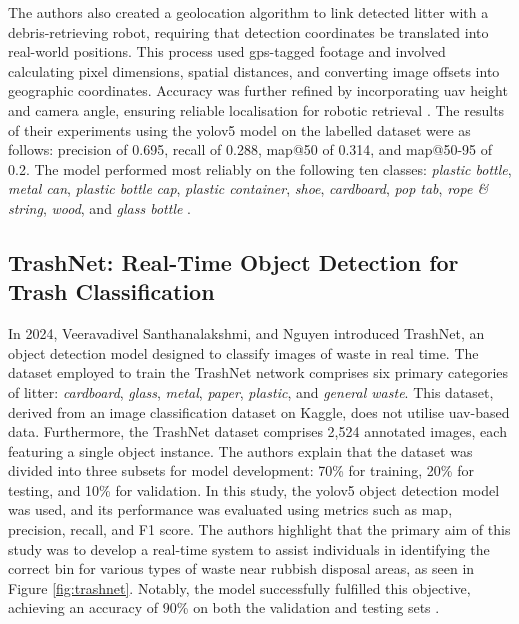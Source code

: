 The authors also created a geolocation algorithm to link detected litter with a debris-retrieving robot, requiring that detection coordinates be translated into real-world positions. This process used \gls{gps}-tagged footage and involved calculating pixel dimensions, spatial distances, and converting image offsets into geographic coordinates. Accuracy was further refined by incorporating \gls{uav} height and camera angle, ensuring reliable localisation for robotic retrieval \cite{beach_litter}.
The results of their experiments using the \gls{yolo}v5 model on the labelled dataset were as follows: precision of 0.695, recall of 0.288, \gls{map}@50 of 0.314, and \gls{map}@50-95 of 0.2. The model performed most reliably on the following ten classes: \textit{plastic bottle}, \textit{metal can}, \textit{plastic bottle} \textit{cap}, \textit{plastic container}, \textit{shoe}, \textit{cardboard}, \textit{pop tab}, \textit{rope \& string}, \textit{wood}, and \textit{glass bottle} \cite{beach_litter}.

\subsection{TrashNet: Real-Time Object Detection for Trash Classification}
\label{subsec:3_trashnet}

In 2024, Veeravadivel Santhanalakshmi, and Nguyen introduced TrashNet, an object detection model designed to classify images of waste in real time. The dataset employed to train the TrashNet network comprises six primary categories of litter: \textit{cardboard}, \textit{glass}, \textit{metal}, \textit{paper}, \textit{plastic}, and \textit{general waste}. This dataset, derived from an image classification dataset on Kaggle, does not utilise \gls{uav}-based data. Furthermore, the TrashNet dataset comprises 2,524 annotated images, each featuring a single object instance. The authors explain that the dataset was divided into three subsets for model development: 70\% for training, 20\% for testing, and 10\% for validation.
In this study, the \gls{yolo}v5 object detection model was used, and its performance was evaluated using metrics such as \gls{map}, precision, recall, and F1 score. 
The authors highlight that the primary aim of this study was to develop a real-time system to assist individuals in identifying the correct bin for various types of waste near rubbish disposal areas, as seen in Figure \ref{fig:trashnet}. Notably, the model successfully fulfilled this objective, achieving an accuracy of 90\% on both the validation and testing sets \cite{trashnet}.

